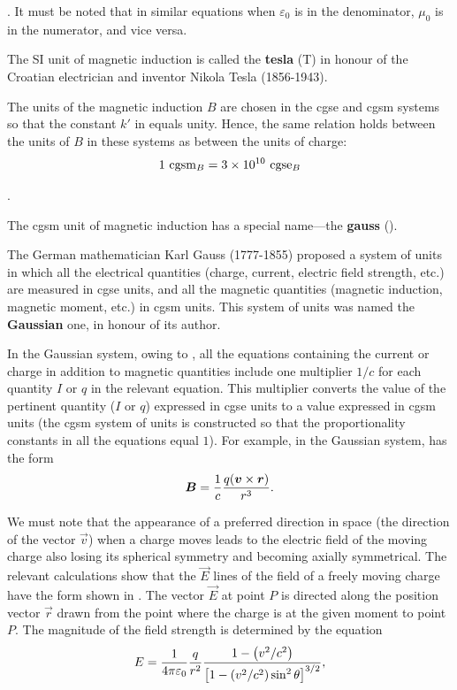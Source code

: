 . It must be noted that in similar equations when $\varepsilon_0$ is in the denominator, $\mu_0$ is in the numerator, and vice versa.

The SI unit of magnetic induction is called the \textbf{tesla} (\si{\tesla}) in honour of the Croatian electrician and inventor Nikola Tesla (1856-1943).

The units of the magnetic induction $B$ are chosen in the cgse and cgsm systems so that the constant $k'$ in  equals unity. Hence, the same relation holds between the units of $B$ in these systems as between the units of charge:
\begin{equation}\label{eq:6_23}
    1 \text{~cgsm$_{B}$} = \num{3e10} \text{~cgse$_{B}$}
\end{equation}

.

The cgsm unit of magnetic induction has a special name---the \textbf{gauss} (\si{\gauss}).

The German mathematician Karl Gauss (1777-1855) proposed a system of units in which all the electrical quantities (charge, current, electric field strength, etc.) are measured in cgse units, and all the magnetic quantities (magnetic induction, magnetic moment, etc.) in cgsm units. This system of units was named the \textbf{Gaussian} one, in honour of its author.

In the Gaussian system, owing to , all the equations containing the current or charge in addition to magnetic quantities include one multiplier $1/c$ for each quantity $I$ or $q$ in the relevant equation. This multiplier converts the value of the pertinent quantity ($I$ or $q$) expressed in cgse units to a value expressed in cgsm units (the cgsm system of units is constructed so that the proportionality constants in all the equations equal $1$). For example, in the Gaussian system,  has the form
\begin{equation}\label{eq:6_24}
    \boldsymbol{B} = \frac{1}{c} \frac{q (\boldsymbol{v}\times\boldsymbol{r})}{r^3}.
\end{equation}

We must note that the appearance of a preferred direction in space (the direction of the vector $\vec{v}$) when a charge moves leads to the electric field of the moving charge also losing its spherical symmetry and becoming axially symmetrical. The relevant calculations show that the $\vec{E}$ lines of the field of a freely moving charge have the form shown in . The vector $\vec{E}$ at point $P$ is directed along the position vector $\vec{r}$ drawn from the point where the charge is at the given moment to point $P$. The magnitude of the field strength is determined by the equation
\begin{equation}\label{eq:6_25}
    E = \frac{1}{4\pi\varepsilon_0} \frac{q}{r^2} \frac{1 - \left(v^2/c^2\right)}{\left[1 - \left(v^2/c^2\right)\sin^2\theta\right]^{3/2}},
\end{equation}

